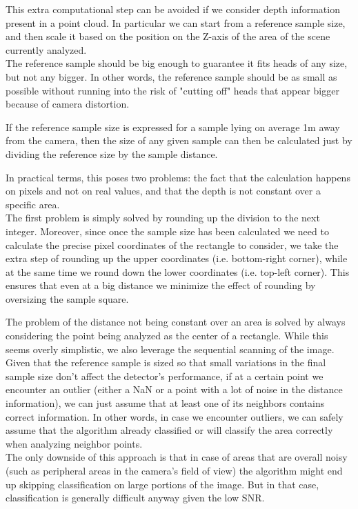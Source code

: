 \documentclass[a4paper,11pt,titlepage]{article}
\begin{document}
This extra computational step can be avoided if we consider depth information
present in a point cloud. In particular we can start from a reference sample
size, and then scale it based on the position on the Z-axis of the area of the
scene currently analyzed. \\
The reference sample should be big enough to guarantee it fits heads of any
size, but not any bigger. In other words, the reference sample should be as
small as possible without running into the risk of "cutting off" heads that
appear bigger because of camera distortion.

If the reference sample size is expressed for a sample lying on average 1m away
from the camera, then the size of any given sample can then be calculated just
by dividing the reference size by the sample distance.

In practical terms, this poses two problems: the fact that the calculation
happens on pixels and not on real values, and that the depth is not constant
over a specific area. \\
The first problem is simply solved by rounding up the division to the next
integer. Moreover, since once the sample size has been calculated we need to
calculate the precise pixel coordinates of the rectangle to consider, we take
the extra step of rounding up the upper coordinates (i.e. bottom-right corner),
while at the same time we round down the lower coordinates (i.e. top-left
corner). This ensures that even at a big distance we minimize the effect of
rounding by oversizing the sample square.

The problem of the distance not being constant over an area is solved by always
considering the point being analyzed as the center of a rectangle. While this
seems overly simplistic, we also leverage the sequential scanning of the image.
Given that the reference sample is sized so that small variations in the final
sample size don't affect the detector's performance, if at a certain point we
encounter an outlier (either a NaN or a point with a lot of noise in the
distance information), we can just assume that at least one of its neighbors
contains correct information. In other words, in case we encounter outliers, we
can safely assume that the algorithm already classified or will classify the
area correctly when analyzing neighbor points. \\
The only downside of this approach is that in case of areas that are overall
noisy (such as peripheral areas in the camera's field of view) the algorithm
might end up skipping classification on large portions of the image. But in that
case, classification is generally difficult anyway given the low SNR.
\end{document}
